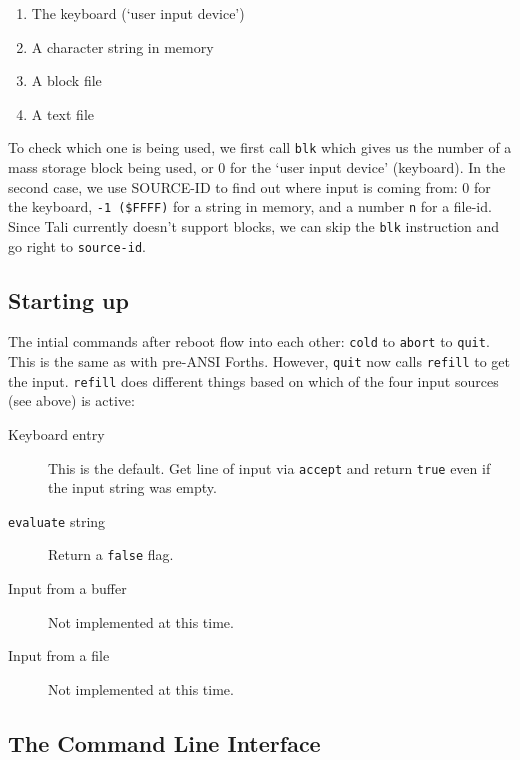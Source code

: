 \begin{enumerate}
        \item The keyboard (`user input device')
        \item A character string in memory
        \item A block file
        \item A text file
\end{enumerate}

To check which one is being used, we first call
\texttt{blk} which gives us the number of a mass storage
block being used, or 0 for the `user input device' (keyboard). In the second
case, we use SOURCE-ID to find out where input is coming from: 0 for the
keyboard, \texttt{-1 (\$FFFF)} for a string in memory, and a number \texttt{n}
for a file-id. Since Tali currently doesn't support blocks, we
can skip the \texttt{blk} instruction and go right to \texttt{source-id}. 


\subsection{Starting up}

The intial commands after reboot flow into each other: \texttt{cold} to
\texttt{abort} to \texttt{quit}. This is the same as with pre-ANSI Forths.
However, \texttt{quit} now calls \texttt{refill} to get the input.
\texttt{refill} does different things based on which of the four input sources
(see above) is active: 

\begin{description} 
        \item [Keyboard entry] This is the default. Get line of input via
                \texttt{accept} and return \texttt{true} even if the input string was
                empty.
        \item [\texttt{evaluate} string] Return a \texttt{false} flag.
        \item [Input from a buffer] Not implemented at this time.
        \item [Input from a file] Not implemented at this time.
\end{description}


\subsection{The Command Line Interface}

